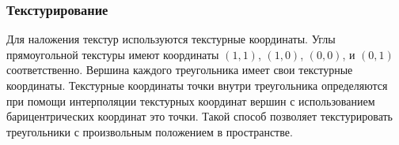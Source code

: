 \subsubsection*{Текстурирование}
Для наложения текстур используются текстурные координаты. Углы прямоугольной текстуры имеют координаты $(1, 1)$, $(1, 0)$, $(0, 0)$, и $(0, 1)$ соответственно. Вершина каждого треугольника имеет свои текстурные координаты. Текстурные координаты точки внутри треугольника определяются при помощи интерполяции текстурных координат вершин с использованием барицентрических координат это точки. Такой способ позволяет текстурировать треугольники с произвольным положением в пространстве.

\pagebreak